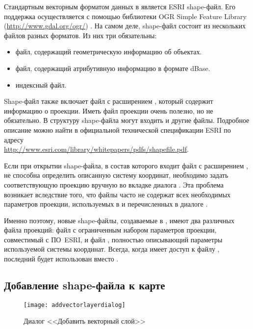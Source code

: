 Стандартным векторным форматом данных в \qg является ESRI shape-файл. Его
поддержка осуществляется с помощью библиотеки OGR Simple Feature Library
(\url{http://www.gdal.org/ogr/}) . На самом деле, shape-файл
состоит из нескольких файлов разных форматов. Из них три
обязательны: 

\begin{itemize}[label=--]
\item {} файл, содержащий геометрическую информацию об объектах.
\item {} файл, содержащий атрибутивную информацию в
формате dBase.
\item {} индексный файл.
\end{itemize}

Shape-файл также включает файл с расширением , который
содержит информацию о проекции. Иметь файл проекции очень полезно, но не
обязательно. В структуру shape-файла могут входить и другие файлы. Подробное
описание можно найти в официальной технической спецификации ESRI по адресу \\
\url{http://www.esri.com/library/whitepapers/pdfs/shapefile.pdf}.


Если при открытии shape-файла, в состав которого входит файл с расширением
, \qg не способна определить описанную систему координат,
необходимо задать соответствующую проекцию вручную во вкладке
 диалога . Эта проблема возникает вследствие
того, что файлы  часто не содержат всех необходимых параметров
проекции, используемых в \qg и перечисленных в диалоге
.

Именно поэтому, новые shape-файлы, создаваемые в \qg, имеют два различных
файла проекций: файл  с ограниченным набором параметров
проекции, совместимый с ПО~ESRI, и файл , полностью описывающий
параметры используемой системы координат. Всегда, когда \qg имеет доступ
к файлу , последний будет использован вместо .

\subsection{Добавление shape-файла к карте}\label{sec:load_shapefile}

\begin{figure}[ht]
   \centering
   \texttt{[image: addvectorlayerdialog]}
   \caption{Диалог <<Добавить векторный слой>> \wincaption}\label{fig:addvectorlayer}
\end{figure}

